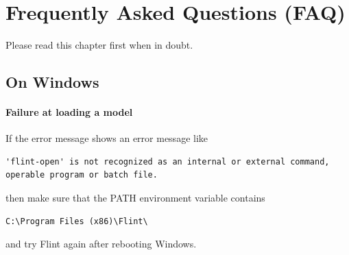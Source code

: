 \documentclass[a4paper,10pt]{report}
\def\FlintVersion{1.8}
\def\Flint{Flint \FlintVersion}
\begin{document}

\chapter{Frequently Asked Questions (FAQ)}
Please read this chapter first when in doubt.

\section{On Windows}
\subsubsection{Failure at loading a model}
If the error message shows an error message like
\begin{verbatim}
'flint-open' is not recognized as an internal or external command,
operable program or batch file.
\end{verbatim}
then make sure that the PATH environment variable contains
\begin{verbatim}
C:\Program Files (x86)\Flint\
\end{verbatim}
and try Flint again after rebooting Windows.
\end{document}
